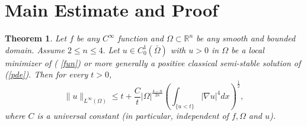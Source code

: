 \documentclass[paper=a4, fontsize=11pt]{scrartcl} %
\numberwithin{equation}{section} %
\numberwithin{figure}{section} %
\numberwithin{table}{section} %
\newtheorem{theorem}{Theorem}
\numberwithin{exercise}{section}
\begin{document}
\section{Main Estimate and Proof}
\begin{theorem}
Let $f$ be any $C^\infty$ function and $\Omega\subset \mathbb{R}^n$ be any smooth and bounded domain. Assume $2\leq n\leq 4.$ Let $u\in C_{0}^1(\bar{\Omega})$ with $u>0$ in $\Omega$ be a local minimizer of (
\ref{fun}) or more generally a positive classical semi-stable solution of (\ref{pde}). Then for every $t>0$,
\begin{equation}\label{main}
\|u\|_{L^\infty(\Omega)}\leq t+\frac{C}{t}|\Omega|^{\frac{4-n}{2n}} \left(\int_{\{u<t\}} |\nabla u|^4 dx \right) ^{\frac{1}{2}},
 \end{equation}
 where $C$ is a universal constant (in particular, independent of $f,\Omega$ and $u$).
 \end{theorem}
 
\end{document}
